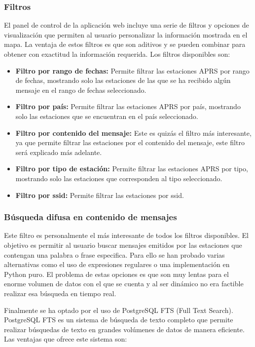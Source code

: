 \subsubsection*{Filtros}
El panel de control de la aplicación web incluye una serie de filtros y opciones de visualización que permiten al usuario personalizar la información mostrada en el mapa. La ventaja de estos filtros es que son aditivos y se pueden combinar para obtener con exactitud la información requerida. Los filtros disponibles son:

\begin{itemize}
	\item \textbf{Filtro por rango de fechas:} Permite filtrar las estaciones APRS por rango de fechas, mostrando solo las estaciones de las que se ha recibido algún mensaje en el rango de fechas seleccionado.
	\item \textbf{Filtro por país:} Permite filtrar las estaciones APRS por país, mostrando solo las estaciones que se encuentran en el país seleccionado.
	\item \textbf{Filtro por contenido del mensaje:} Este es quizás el filtro más interesante, ya que permite filtrar las estaciones por el contenido del mensaje, este filtro será explicado más adelante.
	\item \textbf{Filtro por tipo de estación:} Permite filtrar las estaciones APRS por tipo, mostrando solo las estaciones que corresponden al tipo seleccionado.
	\item \textbf{Filtro por ssid:} Permite filtrar las estaciones por ssid.
\end{itemize}

\subsubsection*{Búsqueda difusa en contenido de mensajes}
Este filtro es personalmente el más interesante de todos los filtros disponibles. El objetivo es permitir al usuario buscar mensajes emitidos por las estaciones que contengan una palabra o frase especifica. Para ello se han probado varias alternativas como el uso de expresiones regulares o una implementación en Python puro. El problema de estas opciones es que son muy lentas para el enorme volumen de datos con el que se cuenta y al ser dinámico no era factible realizar esa búsqueda en tiempo real.

Finalmente se ha optado por el uso de PostgreSQL FTS (Full Text Search). PostgreSQL FTS es un sistema de búsqueda de texto completo que permite realizar búsquedas de texto en grandes volúmenes de datos de manera eficiente. Las ventajas que ofrece este sistema son:


